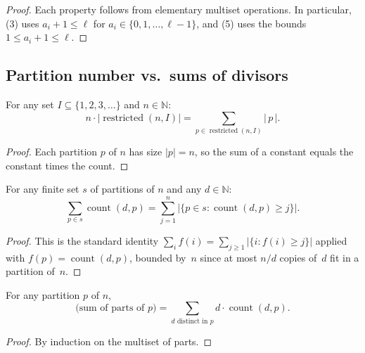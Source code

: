 \begin{proof}
\leanok
Each property follows from elementary multiset operations. In particular,
(3) uses $a_i+1\le\ell$ for $a_i \in \{0,1,\ldots,\ell-1\}$, and
(5) uses the bounds $1\le a_i+1\le\ell$.
\end{proof}

\subsection{Partition number vs.\ sums of divisors}

\begin{lemma}
\label{lem.pars.lhs-eq-sum-parts}
\leanhelper
\leanok
For any set $I\subseteq\{1,2,3,\ldots\}$ and $n\in\mathbb{N}$:
\[
n\cdot |\operatorname{restricted}(n, I)| = \sum_{p\in\operatorname{restricted}(n,I)} |\,p\,|.
\]
\end{lemma}

\begin{proof}
\leanok
Each partition $p$ of $n$ has size $|p| = n$, so the sum of a constant
equals the constant times the count.
\end{proof}

\begin{lemma}
\label{lem.pars.sum-count-eq-sum-card-ge}
\leanhelper
\leanok
For any finite set $s$ of partitions of $n$ and any $d\in\mathbb{N}$:
\[
\sum_{p\in s} \operatorname{count}(d, p) = \sum_{j=1}^{n} |\{p\in s : \operatorname{count}(d,p)\ge j\}|.
\]
\end{lemma}

\begin{proof}
\leanok
This is the standard identity $\sum_i f(i) = \sum_{j\ge 1}|\{i : f(i)\ge j\}|$
applied with $f(p) = \operatorname{count}(d, p)$, bounded by~$n$ since at most $n/d$ copies
of~$d$ fit in a partition of~$n$.
\end{proof}

\begin{lemma}
\label{lem.pars.sum-parts-as-weighted-count}
\leanhelper
\leanok
For any partition $p$ of $n$,
\[
\text{(sum of parts of $p$)} = \sum_{d \text{ distinct in } p} d \cdot \operatorname{count}(d, p).
\]
\end{lemma}

\begin{proof}
\leanok
By induction on the multiset of parts.
\end{proof}

